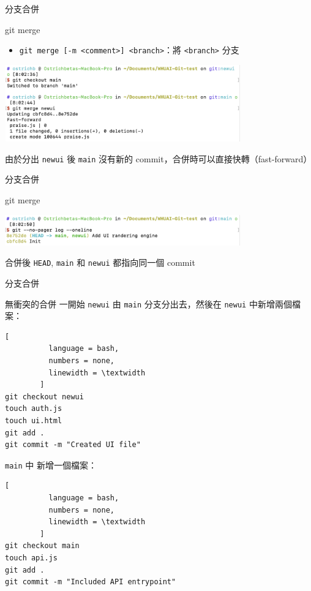 \documentclass[xetex, unicode, 10pt, aspectratio=169]{beamer}
\begin{document}
\begin{frame}{分支合併}
    \begin{block}{git merge}
        \begin{itemize}
            \item \texttt{git merge [-m <comment>] <branch>}：將
                \texttt{<branch>} 分支
        \end{itemize}

        \begin{center}
            \includegraphics[width=4in]{./img/git-merge.png}

            由於分出 \texttt{newui} 後 \texttt{main} 沒有新的 commit，合併時可以直接快轉（fast-forward）
        \end{center}
    \end{block}
\end{frame}

\begin{frame}{分支合併}
    \begin{block}{git merge}
        \begin{center}
            \includegraphics[width=4in]{./img/git-merge-log.png}

            合併後 \texttt{HEAD}, \texttt{main} 和 \texttt{newui} 都指向同一個 commit
        \end{center}
    \end{block}
\end{frame}

\begin{frame}[fragile]{分支合併}
    \begin{block}{無衝突的合併}
        一開始 \texttt{newui} 由 \texttt{main} 分支分出去，然後在 \texttt{newui} 中新增兩個檔案：
        \begin{lstlisting}[
          language = bash,
          numbers = none,
          linewidth = \textwidth
        ]
git checkout newui
touch auth.js
touch ui.html
git add .
git commit -m "Created UI file"\end{lstlisting}
        \texttt{main} 中 新增一個檔案：
        \begin{lstlisting}[
          language = bash,
          numbers = none,
          linewidth = \textwidth
        ]
git checkout main
touch api.js
git add .
git commit -m "Included API entrypoint"\end{lstlisting}
    \end{block}
\end{frame}
\end{document}
